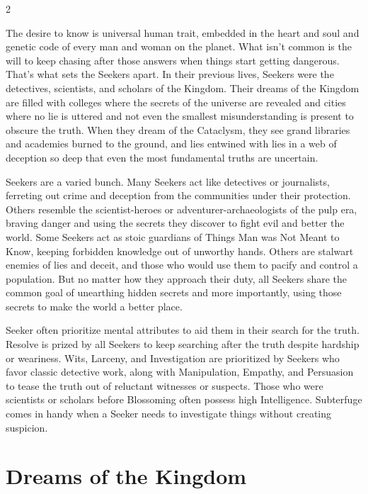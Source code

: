 \label{scha:Seeker}\begin{multicols}{2}\raggedcolumns

\noindent The desire to know is universal human trait, embedded in the heart and soul and genetic code of every man and woman on the planet. What isn't common is the will to keep chasing after those answers when things start getting dangerous. That's what sets the Seekers apart. In their previous lives, Seekers were the detectives, scientists, and scholars of the Kingdom. Their dreams of the Kingdom are filled with colleges where the secrets of the universe are revealed and cities where no lie is uttered and not even the smallest misunderstanding is present to obscure the truth. When they dream of the Cataclysm, they see grand libraries and academies burned to the ground, and lies entwined with lies in a web of deception so deep that even the most fundamental truths are uncertain.

Seekers are a varied bunch. Many Seekers act like detectives or journalists, ferreting out crime and deception from the communities under their protection. Others resemble the scientist-heroes or adventurer-archaeologists of the pulp era, braving danger and using the secrets they discover to fight evil and better the world. Some Seekers act as stoic guardians of Things Man was Not Meant to Know, keeping forbidden knowledge out of unworthy hands. Others are stalwart enemies of lies and deceit, and those who would use them to pacify and control a population. But no matter how they approach their duty, all Seekers share the common goal of unearthing hidden secrets and more importantly, using those secrets to make the world a better place.

Seeker often prioritize mental attributes to aid them in their search for the truth. Resolve is prized by all Seekers to keep searching after the truth despite hardship or weariness. Wits, Larceny, and Investigation are prioritized by Seekers who favor classic detective work, along with Manipulation, Empathy, and Persuasion to tease the truth out of reluctant witnesses or suspects. Those who were scientists or scholars before Blossoming often possess high Intelligence. Subterfuge comes in handy when a Seeker needs to investigate things without creating suspicion.

\section*{Dreams of the Kingdom}


\end{multicols}
